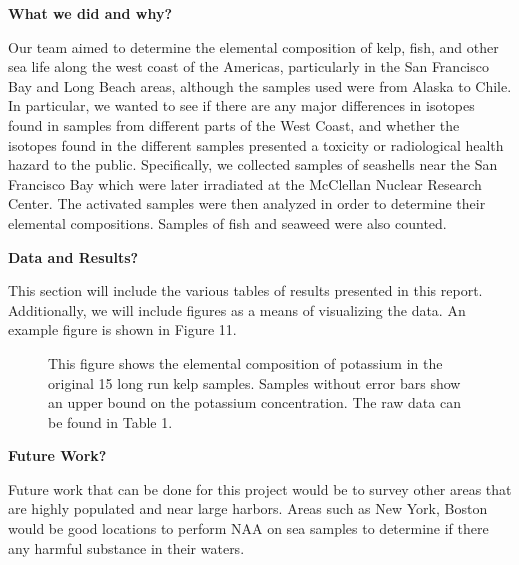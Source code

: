 \documentclass[]{article}
\begin{document}
\textbf{What we did and why?}


Our team aimed to determine the elemental composition of kelp, fish, and other sea life along the west coast of the Americas, particularly in the San Francisco Bay and Long Beach areas, although the samples used were from Alaska to Chile. In particular, we wanted to see if there are any major differences in isotopes found in samples from different parts of the West Coast, and whether the isotopes found in the different samples presented a toxicity or radiological health hazard to the public. Specifically, we collected samples of seashells near the San Francisco Bay which were later irradiated at the McClellan Nuclear Research Center. The activated samples were then analyzed in order to determine their elemental compositions. Samples of fish and seaweed were also counted. 

\textbf{Data and Results?}

This section will include the various tables of results presented in this report. Additionally, we will include figures as a means of visualizing the data. An example figure is shown in Figure 11.

\begin{figure}[htb!]
\centering
{}
\caption{This figure shows the elemental composition of potassium in the original 15 long run kelp samples. Samples without error bars show an upper bound on the potassium concentration. The raw data can be found in Table 1.}
\end{figure}

\pagebreak

\textbf{Future Work?}

Future work that can be done for this project would be to survey other areas that are highly populated and near large harbors. Areas such as New York, Boston would be good locations to perform NAA on sea samples to determine if there any harmful substance in their waters. 
\end{document}
